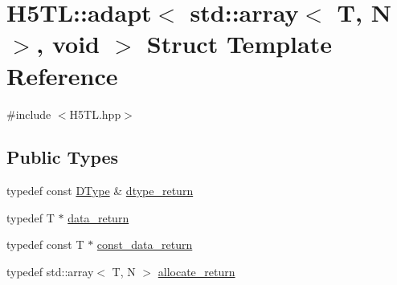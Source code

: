 \hypertarget{struct_h5_t_l_1_1adapt_3_01std_1_1array_3_01_t_00_01_n_01_4_00_01void_01_4}{\section{H5\-T\-L\-:\-:adapt$<$ std\-:\-:array$<$ T, N $>$, void $>$ Struct Template Reference}
\label{struct_h5_t_l_1_1adapt_3_01std_1_1array_3_01_t_00_01_n_01_4_00_01void_01_4}
}


{\ttfamily \#include $<$H5\-T\-L.\-hpp$>$}

\subsection*{Public Types}
\begin{DoxyCompactItemize}
\item 
typedef const \hyperlink{class_h5_t_l_1_1_d_type}{D\-Type} \& \hyperlink{struct_h5_t_l_1_1adapt_3_01std_1_1array_3_01_t_00_01_n_01_4_00_01void_01_4_a1fb1cc7652f556911559cf0f5ceebb9e}{dtype\-\_\-return}
\item 
typedef T $\ast$ \hyperlink{struct_h5_t_l_1_1adapt_3_01std_1_1array_3_01_t_00_01_n_01_4_00_01void_01_4_accd8b93ace8a6bbdb0bdd3ae379aa4b3}{data\-\_\-return}
\item 
typedef const T $\ast$ \hyperlink{struct_h5_t_l_1_1adapt_3_01std_1_1array_3_01_t_00_01_n_01_4_00_01void_01_4_a544cf89eec2ebdad714c22f0e4c31f7c}{const\-\_\-data\-\_\-return}
\item 
typedef std\-::array$<$ T, N $>$ \hyperlink{struct_h5_t_l_1_1adapt_3_01std_1_1array_3_01_t_00_01_n_01_4_00_01void_01_4_a503a3ed58eb6cd304c2a55b54b212b25}{allocate\-\_\-return}
\end{DoxyCompactItemize}
